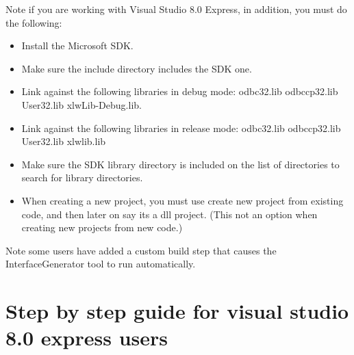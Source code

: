 \documentclass[12pt,reqno]{amsart}
\numberwithin{equation}{section}
\numberwithin{figure}{section}
\begin{document}
Note if you are working with Visual Studio 8.0 Express, in addition, you must do
the following:   
\begin{itemize}
\item Install the Microsoft SDK.
\item Make sure the include directory includes the SDK one.
\item Link against the following libraries in debug mode: odbc32.lib
  odbccp32.lib User32.lib xlwLib-Debug.lib.
\item Link against the following libraries in release mode: odbc32.lib 
odbccp32.lib User32.lib xlwlib.lib
\item Make sure the SDK library directory is included on the list of
  directories to search for library directories. 
\item When creating a new project, you must use create new project
  from existing code, and then later on say its a dll project. (This
  not an option when creating new projects from new code.)
\end{itemize}

Note some users have added a custom build step that causes the
InterfaceGenerator tool to run automatically. 

\section{Step by step guide for visual studio 8.0 express users}
\end{document}
